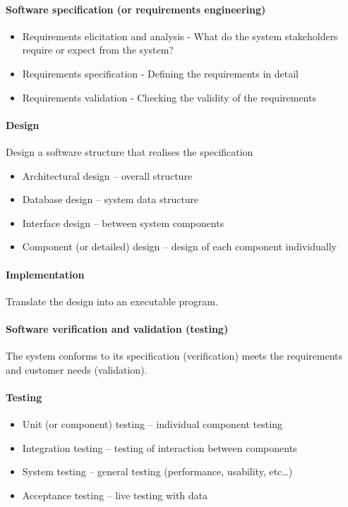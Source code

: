 \documentclass[../ESOF_notes.tex]{subfiles}
\begin{document}
\paragraph{Software specification (or requirements engineering)}
\begin{itemize}
    \item Requirements elicitation and analysis - What do the system stakeholders require or expect from the system?
    \item Requirements specification - Defining the requirements in detail
    \item Requirements validation - Checking the validity of the requirements
\end{itemize}


\paragraph{Design}

Design a software structure that realises the specification

\begin{itemize}
    \item Architectural design – overall structure
    \item Database design – system data structure
    \item Interface design – between system components
    \item Component (or detailed) design – design of each component individually
\end{itemize}

\paragraph{Implementation} 

Translate the design into an executable program.

\paragraph{Software verification and validation (testing)}

The system conforms to its specification (verification)
meets the requirements and customer needs (validation).

\paragraph{Testing}

\begin{itemize}
    \item Unit (or component) testing – individual component testing
    \item Integration testing – testing of interaction between components
    \item System testing – general testing (performance, usability, etc…)
    \item Acceptance testing – live testing with data
\end{itemize}
\end{document}
